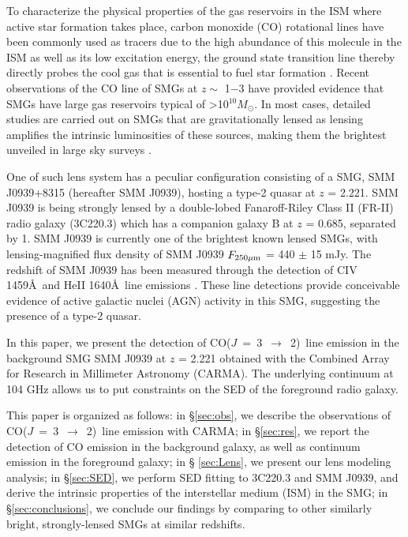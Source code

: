 \documentclass[twocolumn,apj,numberedappendix]{emulateapj}
\newcommand{\Msun}{\mbox{$M_{\odot}$}}
\newcommand{\CO}{\mbox{CO($J$ = 3 $\rightarrow$ 2) }}
\begin{document}
  To characterize the physical properties of the gas reservoirs in the ISM where active star formation takes place, carbon monoxide (CO) rotational lines have been commonly used as tracers due to the high abundance of this molecule in the ISM as well as its low excitation energy, the ground state transition line thereby directly probes the cool gas that is essential to fuel star formation \citep{Carilli13a}. Recent observations of the CO line of SMGs at $z \sim$ 1$-$3 have  
provided evidence that SMGs have large gas reservoirs typical of \textgreater 10$^{10}$\Msun. In most cases, detailed studies are carried out on SMGs that are gravitationally lensed as lensing amplifies the intrinsic luminosities of these sources, making them the brightest unveiled in large sky surveys \citep{Negrello10a,Vieira10a}. \par
One of such lens system has a peculiar configuration consisting of a SMG, SMM J0939+8315 (hereafter SMM J0939), hosting a 
type-2 quasar at $z$ = 2.221. SMM J0939 is being strongly lensed by a double-lobed Fanaroff-Riley Class II (FR-II) \citep*{Fanaroff74} radio galaxy (3C220.3) which has a 
companion galaxy B at $z$ = 0.685, separated by 1. SMM J0939 is currently one of the brightest known lensed
SMGs, with lensing-magnified flux density of SMM J0939 $F_{\rm 250\mu m}$ = 440 $\pm$ 15 mJy. The redshift of SMM J0939 has 
been measured through the detection of CIV 1459\AA\
 and HeII 1640\AA\
line emissions \citep[hereafter H14]{Haas14}. These line detections provide conceivable evidence of active galactic nuclei (AGN) activity in this SMG, suggesting the presence of a type-2 quasar. 

In this paper, we present the detection of \CO line emission in the background SMG
SMM J0939 at $z$ = 2.221 obtained with the Combined
Array for Research in Millimeter Astronomy (CARMA). The underlying continuum at 104 GHz allows us to put constraints on the SED of the 
foreground radio galaxy. 

This paper is organized as follows: in \S \ref{sec:obs}, we describe the
observations of \CO line emission with CARMA; in \S \ref{sec:res}, we report the
detection of CO emission in the background galaxy, as well as continuum emission in the foreground galaxy; in \S
\ref{sec:Lens}, we present our lens modeling analysis; in \S \ref{sec:SED}, we perform SED fitting to 3C220.3
and SMM J0939, and derive the intrinsic properties of the interstellar medium (ISM) in the SMG; in \S \ref{sec:conclusions}, we
conclude our findings by comparing to other similarly bright, strongly-lensed SMGs at similar redshifts.
\end{document}
